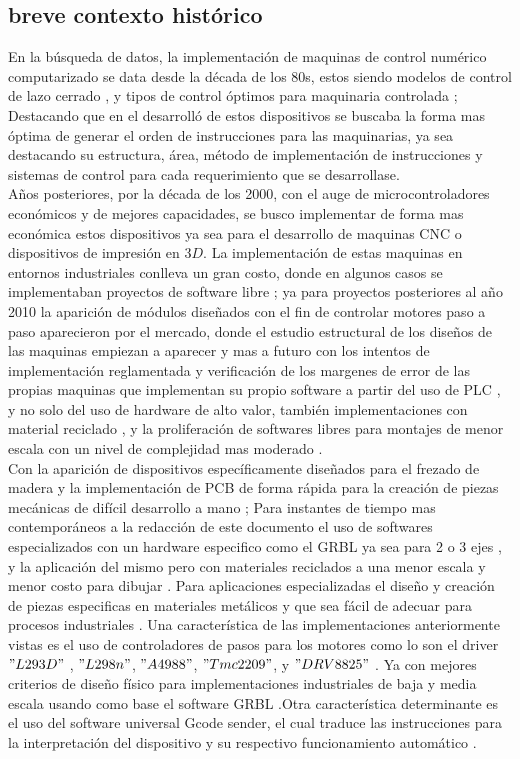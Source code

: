 \documentclass[conference]{IEEEtran}
\begin{document}
\subsection{breve contexto histórico}
En la búsqueda de datos, la implementación de maquinas de control numérico computarizado se data desde la década de los 80s, estos siendo modelos de control de lazo cerrado \cite{b0}, y tipos de control óptimos para maquinaria controlada \cite{b1}; Destacando que en el desarrolló de estos dispositivos se buscaba la forma mas óptima de generar el orden de instrucciones para las maquinarias, ya sea destacando su estructura, área, método de implementación de instrucciones y sistemas de control para cada requerimiento que se desarrollase.\\ 
Años posteriores, por la década de los 2000, con el auge de microcontroladores económicos y de mejores capacidades, se busco implementar de forma mas económica estos dispositivos ya sea para el desarrollo de maquinas CNC o dispositivos de impresión en $3 D$. La implementación de estas maquinas en entornos industriales conlleva un gran costo, donde en algunos casos se implementaban proyectos de software libre \cite{b6}; ya para proyectos posteriores al año 2010 la aparición de módulos diseñados con el fin de controlar motores paso a paso aparecieron por el mercado, donde el estudio estructural de los diseños de las maquinas empiezan a aparecer \cite{b10}  y mas a futuro con los intentos de implementación reglamentada y verificación de los margenes de error de las propias maquinas que implementan su propio software a partir del uso de PLC \cite{b2}, y no solo del uso de hardware de alto valor, también implementaciones con material reciclado \cite{b5}, y la proliferación de softwares libres para montajes de menor escala con un nivel de complejidad mas moderado \cite{b11}.\\ Con la aparición de dispositivos específicamente diseñados para el frezado de madera y la implementación de PCB de forma rápida para la creación de piezas mecánicas de difícil desarrollo a mano \cite{b7}; Para instantes de tiempo mas contemporáneos a la redacción de este documento el uso de softwares  especializados con un hardware especifico como el GRBL ya sea para 2 o 3 ejes \cite{b13}, y la aplicación del mismo pero con materiales reciclados a una menor escala y menor costo para dibujar \cite{b12}. Para aplicaciones especializadas el diseño y creación de piezas especificas en materiales metálicos y que sea fácil de adecuar para procesos industriales  \cite{b4}.
Una característica de las implementaciones anteriormente vistas es el uso de controladores de pasos para los motores como lo son el driver $"L293D"$ , $"L298n"$, $"A4988"$, $"Tmc2209"$, y $"DRV8825"$ \cite{b8}. Ya con mejores criterios de diseño físico para implementaciones industriales de baja y media escala usando como base el software GRBL \cite{b9}.Otra característica determinante es el uso del software universal Gcode sender, el cual traduce las instrucciones para la interpretación del dispositivo y su respectivo funcionamiento automático \cite{b3}.\\
\end{document}
